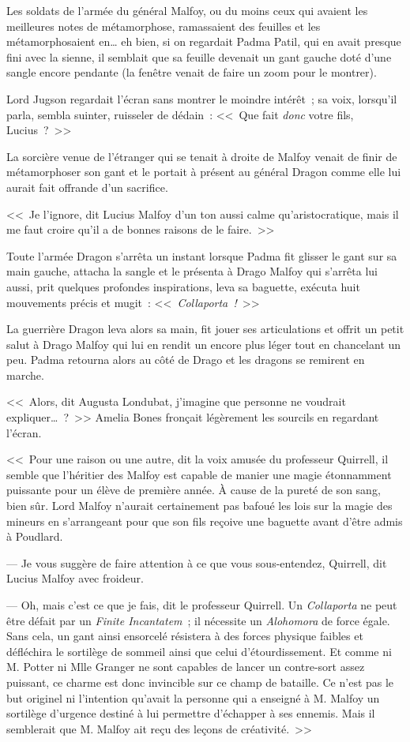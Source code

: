 Les soldats de l'armée du général Malfoy, ou du moins ceux qui avaient les meilleures notes de métamorphose, ramassaient des feuilles et les métamorphosaient en… eh bien, si on regardait Padma Patil, qui en avait presque fini avec la sienne, il semblait que sa feuille devenait un gant gauche doté d'une sangle encore pendante (la fenêtre venait de faire un zoom pour le montrer).

Lord Jugson regardait l'écran sans montrer le moindre intérêt~; sa voix, lorsqu'il parla, sembla suinter, ruisseler de dédain~: <<~Que fait \emph{donc} votre fils, Lucius~?~>>

La sorcière venue de l'étranger qui se tenait à droite de Malfoy venait de finir de métamorphoser son gant et le portait à présent au général Dragon comme elle lui aurait fait offrande d'un sacrifice.

<<~Je l'ignore, dit Lucius Malfoy d'un ton aussi calme qu'aristocratique, mais il me faut croire qu'il a de bonnes raisons de le faire.~>>

Toute l'armée Dragon s'arrêta un instant lorsque Padma fit glisser le gant sur sa main gauche, attacha la sangle et le présenta à Drago Malfoy qui s'arrêta lui aussi, prit quelques profondes inspirations, leva sa baguette, exécuta huit mouvements précis et mugit~: <<~\emph{Collaporta~!}~>>

La guerrière Dragon leva alors sa main, fit jouer ses articulations et offrit un petit salut à Drago Malfoy qui lui en rendit un encore plus léger tout en chancelant un peu. Padma retourna alors au côté de Drago et les dragons se remirent en marche.

<<~Alors, dit Augusta Londubat, j'imagine que personne ne voudrait expliquer…~?~>> Amelia Bones fronçait légèrement les sourcils en regardant l'écran.

<<~Pour une raison ou une autre, dit la voix amusée du professeur Quirrell, il semble que l'héritier des Malfoy est capable de manier une magie étonnamment puissante pour un élève de première année. À cause de la pureté de son sang, bien sûr. Lord Malfoy n'aurait certainement pas bafoué les lois sur la magie des mineurs en s'arrangeant pour que son fils reçoive une baguette avant d'être admis à Poudlard.

--- Je vous suggère de faire attention à ce que vous sous-entendez, Quirrell, dit Lucius Malfoy avec froideur.

--- Oh, mais c'est ce que je fais, dit le professeur Quirrell. Un \emph{Collaporta} ne peut être défait par un \emph{Finite Incantatem}~; il nécessite un \emph{Alohomora} de force égale. Sans cela, un gant ainsi ensorcelé résistera à des forces physique faibles et défléchira le sortilège de sommeil ainsi que celui d'étourdissement. Et comme ni M. Potter ni Mlle Granger ne sont capables de lancer un contre-sort assez puissant, ce charme est donc invincible sur ce champ de bataille. Ce n'est pas le but originel ni l'intention qu'avait la personne qui a enseigné à M. Malfoy un sortilège d'urgence destiné à lui permettre d'échapper à ses ennemis. Mais il semblerait que M. Malfoy ait reçu des leçons de créativité.~>>

